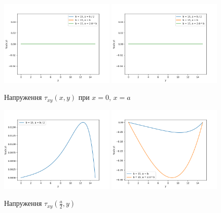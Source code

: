\begin{figure}[h!]
    \begin{center}
        \includegraphics[width=0.49\textwidth, scale=1]{images/results/static_1/tau(0,y).png}
        \includegraphics[width=0.49\textwidth, scale=1]{images/results/static_1/tau(a,y).png}
        \caption{Напруження $\tau_{xy}(x, y)$ при $x=0$, $x=a$}\label{static_1_tau(0/a,y)}
    \end{center}
\end{figure}
\begin{figure}[h!]
    \begin{center}
        \includegraphics[width=0.49\textwidth, scale=1]{images/results/static_1/tau(a:2,y)1.png}
        \includegraphics[width=0.49\textwidth, scale=1]{images/results/static_1/tau(a:2,y)2.png}
        \caption{Напруження $\tau_{xy}(\frac{a}{2}, y)$}\label{static_1_tau(a:2,y)}
    \end{center}
\end{figure}

